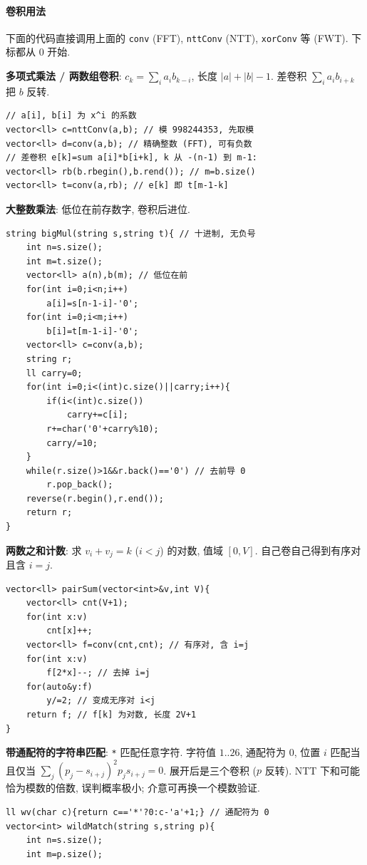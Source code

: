 \paragraph{卷积用法}
下面的代码直接调用上面的 \texttt{conv} (FFT), \texttt{nttConv} (NTT), \texttt{xorConv} 等 (FWT). 下标都从 0 开始.
\begin{compactitem}
\item \textbf{多项式乘法 / 两数组卷积}: $c_k = \sum_i a_i b_{k-i}$, 长度 $|a|+|b|-1$. 差卷积 $\sum_i a_i b_{i+k}$ 把 $b$ 反转.
\begin{lstlisting}
// a[i], b[i] 为 x^i 的系数
vector<ll> c=nttConv(a,b); // 模 998244353, 先取模
vector<ll> d=conv(a,b); // 精确整数 (FFT), 可有负数
// 差卷积 e[k]=sum a[i]*b[i+k], k 从 -(n-1) 到 m-1:
vector<ll> rb(b.rbegin(),b.rend()); // m=b.size()
vector<ll> t=conv(a,rb); // e[k] 即 t[m-1-k]
\end{lstlisting}
\item \textbf{大整数乘法}: 低位在前存数字, 卷积后进位.
\begin{lstlisting}
string bigMul(string s,string t){ // 十进制, 无负号
	int n=s.size();
	int m=t.size();
	vector<ll> a(n),b(m); // 低位在前
	for(int i=0;i<n;i++)
		a[i]=s[n-1-i]-'0';
	for(int i=0;i<m;i++)
		b[i]=t[m-1-i]-'0';
	vector<ll> c=conv(a,b);
	string r;
	ll carry=0;
	for(int i=0;i<(int)c.size()||carry;i++){
		if(i<(int)c.size())
			carry+=c[i];
		r+=char('0'+carry%10);
		carry/=10;
	}
	while(r.size()>1&&r.back()=='0') // 去前导 0
		r.pop_back();
	reverse(r.begin(),r.end());
	return r;
}
\end{lstlisting}
\item \textbf{两数之和计数}: 求 $v_i + v_j = k$ ($i < j$) 的对数, 值域 $[0, V]$. 自己卷自己得到有序对且含 $i = j$.
\begin{lstlisting}
vector<ll> pairSum(vector<int>&v,int V){
	vector<ll> cnt(V+1);
	for(int x:v)
		cnt[x]++;
	vector<ll> f=conv(cnt,cnt); // 有序对, 含 i=j
	for(int x:v)
		f[2*x]--; // 去掉 i=j
	for(auto&y:f)
		y/=2; // 变成无序对 i<j
	return f; // f[k] 为对数, 长度 2V+1
}
\end{lstlisting}
\item \textbf{带通配符的字符串匹配}: \texttt{*} 匹配任意字符. 字符值 $1..26$, 通配符为 0,
位置 $i$ 匹配当且仅当 $\sum_j (p_j - s_{i+j})^2 p_j s_{i+j} = 0$. 展开后是三个卷积 ($p$ 反转).
NTT 下和可能恰为模数的倍数, 误判概率极小; 介意可再换一个模数验证.
\begin{lstlisting}
ll wv(char c){return c=='*'?0:c-'a'+1;} // 通配符为 0
vector<int> wildMatch(string s,string p){
	int n=s.size();
	int m=p.size();

\end{lstlisting}
\end{compactitem}
